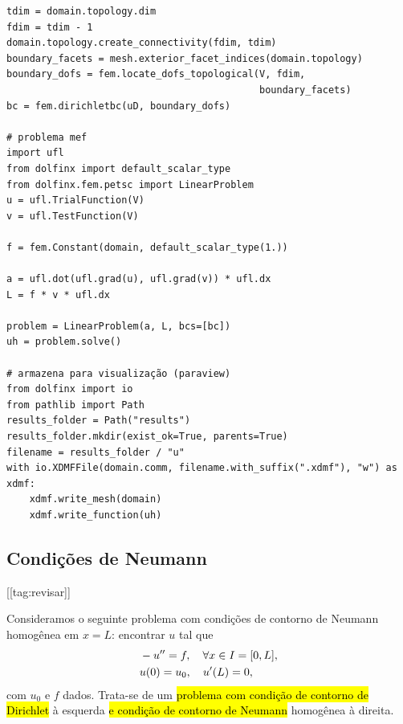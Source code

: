 \begin{ex}
\begin{lstlisting}[caption=ex\_mef1d\_dirichlet.py]
tdim = domain.topology.dim
fdim = tdim - 1
domain.topology.create_connectivity(fdim, tdim)
boundary_facets = mesh.exterior_facet_indices(domain.topology)
boundary_dofs = fem.locate_dofs_topological(V, fdim,
                                            boundary_facets)
bc = fem.dirichletbc(uD, boundary_dofs)

# problema mef
import ufl
from dolfinx import default_scalar_type
from dolfinx.fem.petsc import LinearProblem
u = ufl.TrialFunction(V)
v = ufl.TestFunction(V)

f = fem.Constant(domain, default_scalar_type(1.))

a = ufl.dot(ufl.grad(u), ufl.grad(v)) * ufl.dx
L = f * v * ufl.dx

problem = LinearProblem(a, L, bcs=[bc])
uh = problem.solve()

# armazena para visualização (paraview)
from dolfinx import io
from pathlib import Path
results_folder = Path("results")
results_folder.mkdir(exist_ok=True, parents=True)
filename = results_folder / "u"
with io.XDMFFile(domain.comm, filename.with_suffix(".xdmf"), "w") as xdmf:
    xdmf.write_mesh(domain)
    xdmf.write_function(uh)
\end{lstlisting}
\end{ex}

\subsection{Condições de Neumann}
[[tag:revisar]]

Consideramos o seguinte problema com condições de contorno de Neumann{\neumann} homogênea em $x=L$: encontrar $u$ tal que
\begin{align}\hleq
  &-u'' = f,\quad \forall x\in I=[0, L],\label{eq:cc_n_eq}\\
  &u(0) = u_0,\quad u'(L) = 0,\label{eq:cc_n_bc}
\end{align}
com $u_0$ e $f$ dados. Trata-se de um \hl{problema com condição de contorno de Dirichlet} à esquerda \hl{e condição de contorno de Neumann}{\neumann} homogênea à direita.

